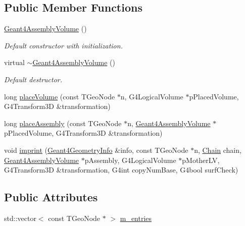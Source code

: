 \subsection*{Public Member Functions}
\begin{DoxyCompactItemize}
\item 
\hyperlink{class_d_d4hep_1_1_simulation_1_1_geant4_assembly_volume_a140dd17a22b41606681a2494737ed02a}{Geant4AssemblyVolume} ()
\begin{DoxyCompactList}\small\item\em Default constructor with initialization. \item\end{DoxyCompactList}\item 
virtual \hyperlink{class_d_d4hep_1_1_simulation_1_1_geant4_assembly_volume_a62b2a9ebf445a8482edbe01918d55243}{$\sim$Geant4AssemblyVolume} ()
\begin{DoxyCompactList}\small\item\em Default destructor. \item\end{DoxyCompactList}\item 
long \hyperlink{class_d_d4hep_1_1_simulation_1_1_geant4_assembly_volume_a7ab45077a09ab1397f437b167b097c94}{placeVolume} (const TGeoNode $\ast$n, G4LogicalVolume $\ast$pPlacedVolume, G4Transform3D \&transformation)
\item 
long \hyperlink{class_d_d4hep_1_1_simulation_1_1_geant4_assembly_volume_adde18f645695f14e3ae08d7fed2451c1}{placeAssembly} (const TGeoNode $\ast$n, \hyperlink{class_d_d4hep_1_1_simulation_1_1_geant4_assembly_volume}{Geant4AssemblyVolume} $\ast$pPlacedVolume, G4Transform3D \&transformation)
\item 
void \hyperlink{class_d_d4hep_1_1_simulation_1_1_geant4_assembly_volume_a5f445612042e1ff7a273e1c2fdb5111b}{imprint} (\hyperlink{class_d_d4hep_1_1_simulation_1_1_geant4_geometry_info}{Geant4GeometryInfo} \&info, const TGeoNode $\ast$n, \hyperlink{class_d_d4hep_1_1_simulation_1_1_geant4_assembly_volume_ad79481b292635c219fcc03d160689211}{Chain} chain, \hyperlink{class_d_d4hep_1_1_simulation_1_1_geant4_assembly_volume}{Geant4AssemblyVolume} $\ast$pAssembly, G4LogicalVolume $\ast$pMotherLV, G4Transform3D \&transformation, G4int copyNumBase, G4bool surfCheck)
\end{DoxyCompactItemize}
\subsection*{Public Attributes}
\begin{DoxyCompactItemize}
\item 
std::vector$<$ const TGeoNode $\ast$ $>$ \hyperlink{class_d_d4hep_1_1_simulation_1_1_geant4_assembly_volume_a0d910d90aa651bf5ccb3816c5ce3641a}{m\_\-entries}
\end{DoxyCompactItemize}



